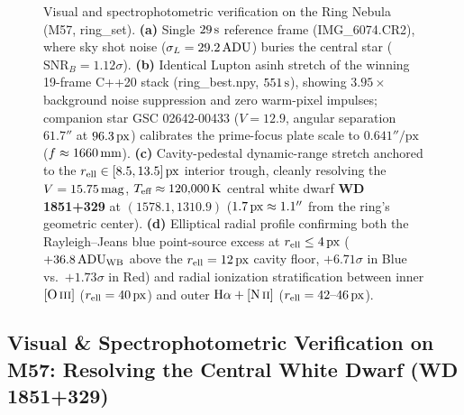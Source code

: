 \documentclass[10pt,twocolumn,letterpaper]{article}
\DeclareRobustCommand{\code}[1]{\texttt{#1}}
\def\code#1{#1}%
\begin{document}
\begin{figure}[t]
{%
  }
  \vspace{-0.4em}
  \caption{Visual and spectrophotometric verification on the Ring Nebula (M57, \code{ring\_set}). \textbf{(a)} Single $29\text{\,s}$ reference frame (\code{IMG\_6074.CR2}), where sky shot noise ($\sigma_L = 29.2\text{\,ADU}$) buries the central star ($\text{SNR}_B = 1.12\sigma$). \textbf{(b)} Identical Lupton \code{asinh} stretch of the winning 19-frame C++20 stack (\code{ring\_best.npy}, $551\text{\,s}$), showing $3.95\times$ background noise suppression and zero warm-pixel impulses; companion star \code{GSC 02642-00433} ($V=12.9$, angular separation $61.7''$ at $96.3\text{\,px}$) calibrates the prime-focus plate scale to $0.641''/\text{px}$ ($f \approx 1660\text{\,mm}$). \textbf{(c)} Cavity-pedestal dynamic-range stretch anchored to the $r_{\text{ell}} \in [8.5, 13.5]\text{\,px}$ interior trough, cleanly resolving the $V = 15.75\text{\,mag}$, $T_{\text{eff}} \approx 120{,}000\text{\,K}$ central white dwarf \textbf{\code{WD 1851+329}} at $(1578.1, 1310.9)$ ($1.7\text{\,px} \approx 1.1''$ from the ring's geometric center). \textbf{(d)} Elliptical radial profile confirming both the Rayleigh--Jeans blue point-source excess at $r_{\text{ell}} \le 4\text{\,px}$ ($+36.8\text{\,ADU}_{\text{WB}}$ above the $r_{\text{ell}}=12\text{\,px}$ cavity floor, $+6.71\sigma$ in Blue vs.\ $+1.73\sigma$ in Red) and radial ionization stratification between inner $[\text{O\,\textsc{iii}}]$ ($r_{\text{ell}} = 40\text{\,px}$) and outer $\text{H}\alpha + [\text{N\,\textsc{ii}}]$ ($r_{\text{ell}} = 42\text{--}46\text{\,px}$).}
  \label{fig:m57_visual}
\end{figure}

\subsection{Visual \& Spectrophotometric Verification on M57: Resolving the Central White Dwarf (\code{WD 1851+329})}
\end{document}
